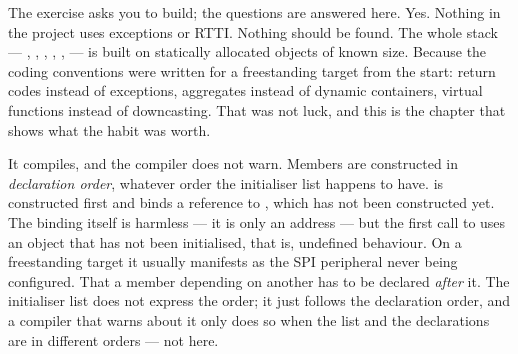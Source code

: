 The exercise asks you to build; the questions are answered here.
 Yes. Nothing in the project uses exceptions or RTTI.
 Nothing should be found. The whole stack --- , , ,
, ,  --- is built on statically allocated objects of
known size.
 Because the coding conventions were written for a freestanding target from the start:
return codes instead of exceptions, aggregates instead of dynamic containers, virtual functions
instead of downcasting. That was not luck, and this is the chapter that shows what the habit was
worth.

 It compiles, and the compiler does not warn. Members are constructed in
\emph{declaration order}, whatever order the initialiser list happens to have.
  is constructed first and binds a reference to , which has
not been constructed yet. The binding itself is harmless --- it is only an address --- but the
first call to  uses an object that has not been initialised, that is, undefined
behaviour. On a freestanding target it usually manifests as the SPI peripheral never being
configured.
 That a member depending on another has to be declared \emph{after} it. The initialiser
list does not express the order; it just follows the declaration order, and a compiler that warns
about it only does so when the list and the declarations are in different orders --- not here.
